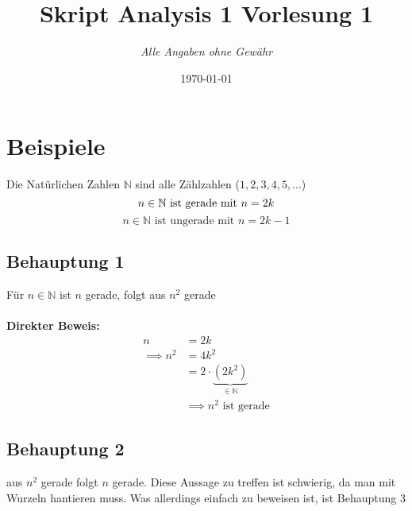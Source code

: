 \documentclass{article}
\title{Skript Analysis 1 Vorlesung 1} %
\author{\textit{Alle Angaben ohne Gewähr}} %
\date{\today} %
\begin{document}

	\maketitle %
    \section{Beispiele}
        Die Natürlichen Zahlen $\mathbb{N}$ sind alle Zählzahlen ($1,2,3,4,5,...$) \\
         $$n\in \mathbb{N} \text{ ist gerade mit } n=2k\\$$
         $$n\in \mathbb{N} \text{ ist ungerade mit } n=2k-1$$
        \subsection{Behauptung 1}
            Für $n\in \mathbb{N}$ ist $n$ gerade, folgt aus $n^2$ gerade\\\\
            \textbf{Direkter Beweis:}
            \begin{align*}
                n &= 2k \\
                \implies n^2 &= 4k^2 \\
                \, &= 2 \cdot \underbrace{(2k^2)}_{\in \mathbb{N}} \\
                &\implies n^2 \text{ ist gerade}
            \end{align*}
        \subsection{Behauptung 2}
            aus $n^2$ gerade folgt $n$ gerade. Diese Aussage zu treffen ist schwierig, da man mit Wurzeln hantieren muss. Was allerdings einfach zu beweisen ist, ist Behauptung 3
\end{document}

